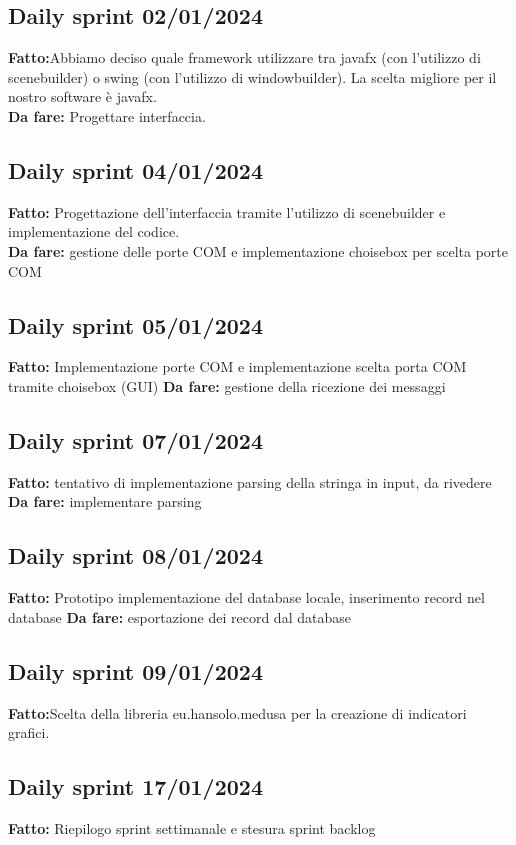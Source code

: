 \documentclass{report}
\begin{document}
\subsection*{Daily sprint 02/01/2024}
\textbf{Fatto:}Abbiamo deciso quale framework utilizzare tra javafx (con l'utilizzo di scenebuilder) o swing (con l'utilizzo di windowbuilder). La scelta migliore per il nostro software è javafx.\\
\textbf{Da fare:} Progettare interfaccia.

\subsection*{Daily sprint 04/01/2024}
\textbf{Fatto:} Progettazione dell'interfaccia tramite l'utilizzo di scenebuilder e implementazione del codice.\\
\textbf{Da fare:} gestione delle porte COM e implementazione choisebox per scelta porte COM
\subsection*{Daily sprint 05/01/2024}
\textbf{Fatto:} Implementazione porte COM e implementazione scelta porta COM tramite choisebox (GUI)
\textbf{Da fare:} gestione della ricezione dei messaggi

\subsection*{Daily sprint 07/01/2024}
\textbf{Fatto:} tentativo di implementazione parsing della stringa in input, da rivedere
\textbf{Da fare:} implementare parsing
\subsection*{Daily sprint 08/01/2024}
\textbf{Fatto:} Prototipo implementazione del database locale, inserimento record nel database
\textbf{Da fare:} esportazione dei record dal database
\subsection*{Daily sprint 09/01/2024}
\textbf{Fatto:}Scelta della libreria eu.hansolo.medusa per la creazione di indicatori grafici.\\

\subsection*{Daily sprint 17/01/2024}
\textbf{Fatto:} Riepilogo sprint settimanale e stesura sprint backlog\\\\
\end{document}
